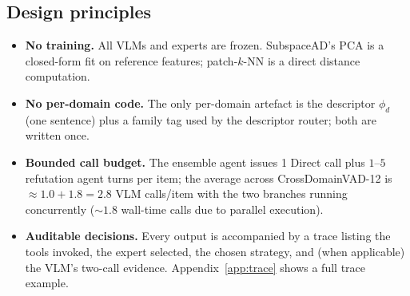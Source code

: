 \subsection{Design principles}
\label{ssec:principles}
\begin{itemize}
    \item \textbf{No training.} All VLMs and experts are frozen. SubspaceAD's PCA is a closed-form fit on reference features; patch-$k$-NN is a direct distance computation.
    \item \textbf{No per-domain code.} The only per-domain artefact is the descriptor $\phi_d$ (one sentence) plus a family tag used by the descriptor router; both are written once.
    \item \textbf{Bounded call budget.} The ensemble agent issues 1 Direct call plus $1$--$5$ refutation agent turns per item; the average across CrossDomainVAD-12 is $\approx 1.0 + 1.8 = 2.8$ VLM calls/item with the two branches running concurrently ($\sim 1.8$ wall-time calls due to parallel execution).
    \item \textbf{Auditable decisions.} Every output is accompanied by a trace listing the tools invoked, the expert selected, the chosen strategy, and (when applicable) the VLM's two-call evidence. Appendix~\ref{app:trace} shows a full trace example.
\end{itemize}
